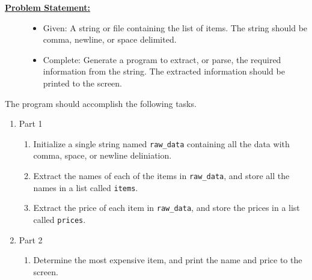 \documentclass[12pt]{article}
\begin{document}
\begin{description}[labelindent=1cm]
\begin{description}
   \item[\textbf{\underline{Problem Statement:}}] \hfill \vspace{0mm}

	\begin{itemize}

		\item Given: A string or file containing the list of items. The string should be comma, newline, or space delimited.
		
		\item Complete: Generate a program to extract, or parse, the required information from the string. The extracted information should be printed to the screen.  

	\end{itemize}      


	\end{description}


\newpage
\item[\textbf{\underline{Program Minimum Requirements:}}] \hfill \vspace{0mm}

The program should accomplish the following tasks. 

\begin{enumerate}
	
	\item Part 1 
		\begin{enumerate}

	      \item Initialize a single string named \lstinline{raw_data} containing all the data with comma, space, or newline deliniation. \\
	    
	      \item Extract the names of each of the items in \lstinline{raw_data}, and store all the names in a list called \lstinline{items}. \\

	      \item Extract the price of each item in \lstinline{raw_data}, and store the prices in a list called \lstinline{prices}. \\
	      
		\end{enumerate}	 

	\item Part 2
		\begin{enumerate}

	      \item Determine the most expensive item, and print the name and price to the screen.\\
	      

\end{enumerate}
\end{enumerate}
\end{description}
\end{document}
